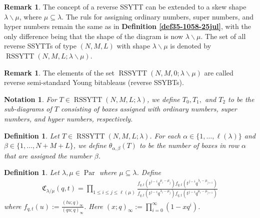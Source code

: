 \documentclass[12pt,reqno,a4paper]{amsart}
\newcommand{\fraks}[1]{\mathfrak{#1}}
\numberwithin{equation}{section}
\newtheorem{dfn}[thm]{Definition}
\newtheorem{nota}[thm]{Notation}
\theoremstyle{definition}
\newtheorem{rem}[thm]{Remark}
\begin{document}
\begin{rem}
The concept of a reverse SSYTT can be extended to a skew shape $\lambda\backslash\mu$, where $\mu \subseteq \lambda$. The ruls for assigning ordinary numbers, super numbers, and hyper numbers remain the same as in \textbf{Definition \ref{def35-1058-25jul}}, with the only difference being that the shape of the diagram is now $\lambda\backslash\mu$. The set of all reverse SSYTTs of type $(N,M,L)$ with shape $\lambda\backslash\mu$ is denoted by $\operatorname{RSSYTT}(N,M,L;\lambda\backslash\mu)$. 
\end{rem}

\begin{rem}
The elements of the set $\operatorname{RSSYTT}(N,M,0;\lambda\backslash\mu)$ are called reverse semi-standard Young bitableaus (reverse SSYBTs). 
\end{rem}

\begin{nota}
For $T \in \operatorname{RSSYTT}(N,M,L;\lambda)$, we define 
$T_0,T_1,$ and $T_2$ to be the sub-diagrams of $T$ consisting of boxes assigned with ordinary numbers, super numbers, and hyper numbers, respectively. 
\end{nota}



\begin{dfn}
Let $T \in \operatorname{RSSYTT}(N,M,L;\lambda)$. For each $\alpha \in \{1,\dots,\ell(\lambda)\}$ and $\beta \in \{1,\dots,N+M+L\}$, we define $\theta_{\alpha,\beta}(T)$ to be the number of boxes in row $\alpha$ that are assigned the number $\beta$. 
\end{dfn}


\begin{dfn}
Let $\lambda, \mu \in \operatorname{Par}$ where $\mu \subseteq \lambda$. Define 
\begin{align}
	\fraks{C}_{\lambda/\mu}(q,t)
	=
	\prod_{
		1 \leq i \leq j \leq \ell(\mu)
	}
	\frac{
		f_{q,t}\left(	t^{j - i} q^{ \mu_{i} 	- \mu_{j}	 		}						\right)
		f_{q,t}\left(		
		t^{j - i} q^{ \lambda_{i} 	- \mu_{j + 1} 		}					\right)
	}{
		f_{q,t}\left(	t^{j - i} q^{ \lambda_{i} 	- \mu_{j}		}						\right)
		f_{q,t}\left(		
		t^{j- i} q^{ \mu_{i} 	- \mu_{j + 1}			}					\right)
	}
\end{align}
where $\displaystyle f_{q,t}(u) := \frac{(tu;q)_\infty}{(qu;q)_\infty}$. Here $(x;q)_\infty := \prod_{i = 0}^{\infty}(1 - xq^i)$. 
\end{dfn}
\end{document}

